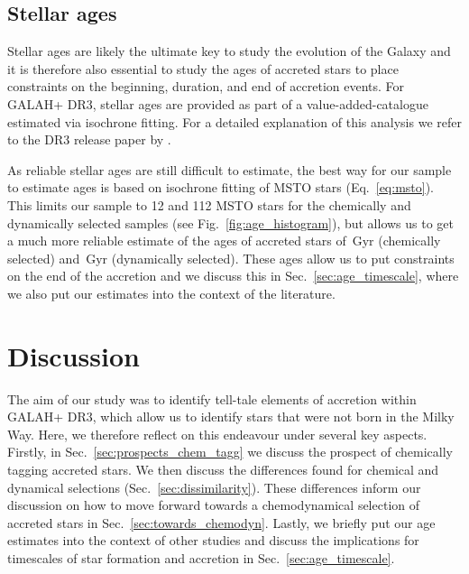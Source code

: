 \documentclass[fleqn,usenatbib]{mnras}
\newcommand{\Gyr}{\,\mathrm{Gyr}}	%
\begin{document}
\subsection{Stellar ages} \label{sec:gse_stellar_ages}

Stellar ages are likely the ultimate key to study the evolution of the Galaxy and it is therefore also essential to study the ages of accreted stars to place constraints on the beginning, duration, and end of accretion events. For GALAH+ DR3, stellar ages are provided as part of a value-added-catalogue estimated via isochrone fitting. For a detailed explanation of this analysis we refer to the DR3 release paper by \citet{Buder2021}.

As reliable stellar ages are still difficult to estimate, the best way for our sample to estimate ages is based on isochrone fitting of MSTO stars (Eq.~\ref{eq:msto}). This limits our sample to 12 and 112 MSTO stars for the chemically and dynamically selected samples (see Fig.~\ref{fig:age_histogram}), but allows us to get a much more reliable estimate of the ages of accreted stars of $\Gyr$ (chemically selected) and $\Gyr$ (dynamically selected). These ages allow us to put constraints on the end of the accretion and we discuss this in Sec.~\ref{sec:age_timescale}, where we also put our estimates into the context of the literature.

\section{Discussion} \label{sec:discussion}

The aim of our study was to identify tell-tale elements of accretion within GALAH+ DR3, which allow us to identify stars that were not born in the Milky Way. Here, we therefore reflect on this endeavour under several key aspects. Firstly, in Sec.~\ref{sec:prospects_chem_tagg} we discuss the prospect of chemically tagging accreted stars. We then discuss the differences found for chemical and dynamical selections (Sec.~\ref{sec:dissimilarity}). These differences inform our discussion on how to move forward towards a chemodynamical selection of accreted stars in Sec.~\ref{sec:towards_chemodyn}. Lastly, we briefly put our age estimates into the context of other studies and discuss the implications for timescales of star formation and accretion in Sec.~\ref{sec:age_timescale}.
\end{document}
